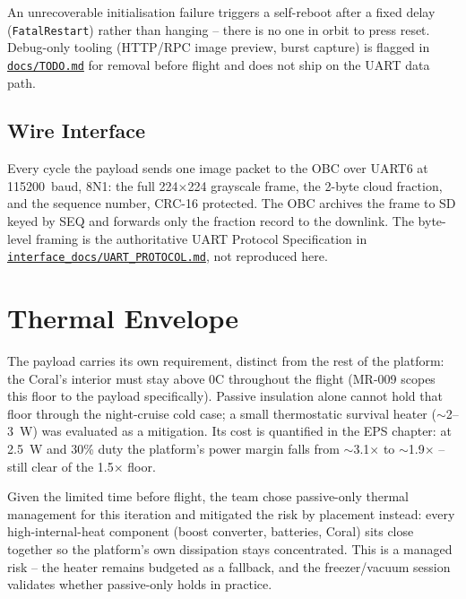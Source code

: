 An unrecoverable initialisation failure triggers a self-reboot after a fixed
delay (\texttt{FatalRestart}) rather than hanging -- there is no one in orbit
to press reset. Debug-only tooling (HTTP/RPC image preview, burst capture)
is flagged in
\href{\repourl/blob/main/payload/coral/docs/TODO.md}{\texttt{docs/TODO.md}}
for removal before flight and does not
ship on the UART data path.

\subsection{Wire Interface}

Every cycle the payload sends one image packet to the OBC over UART6 at
115200~baud, 8N1: the full 224$\times$224 grayscale frame, the 2-byte cloud
fraction, and the sequence number, CRC-16 protected. The OBC archives the
frame to SD keyed by SEQ and forwards only the fraction record to the
downlink. The byte-level framing is the authoritative UART Protocol
Specification in
\href{\repourl/blob/main/interface_docs/UART_PROTOCOL.md}{\texttt{interface\_docs/UART\_PROTOCOL.md}},
not reproduced here.

\section{Thermal Envelope}

The payload carries its own requirement, distinct from the rest of the
platform: the Coral's interior must stay above 0\textdegree{}C throughout
the flight (MR-009 scopes this floor to the payload specifically). Passive
insulation alone cannot hold that floor through the night-cruise cold case;
a small thermostatic survival heater ($\sim$2--3~W) was evaluated as a
mitigation. Its cost is quantified in the EPS chapter: at 2.5~W and 30\%
duty the platform's power margin falls from $\sim$3.1$\times$ to
$\sim$1.9$\times$ -- still clear of the 1.5$\times$ floor.

Given the limited time before flight, the team chose passive-only thermal
management for this iteration and mitigated the risk by placement instead:
every high-internal-heat component (boost converter, batteries, Coral) sits
close together so the platform's own dissipation stays concentrated. This is
a managed risk -- the heater remains budgeted as a fallback, and the
freezer/vacuum session validates whether passive-only holds in practice.
